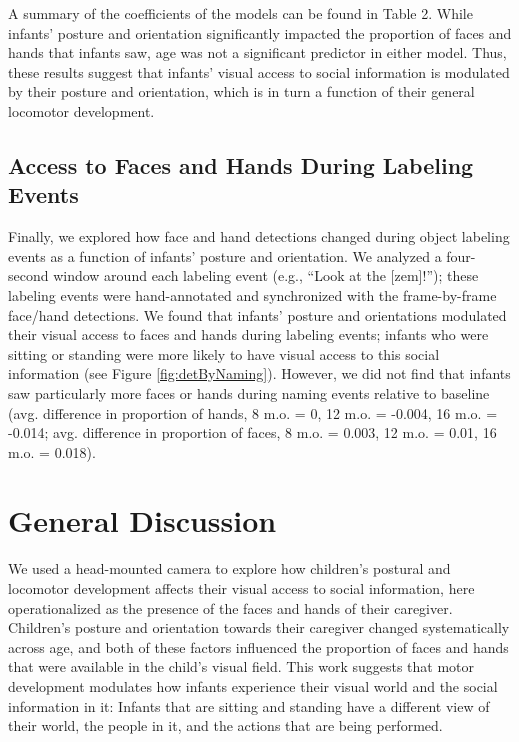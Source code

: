 \documentclass[10pt, letterpaper]{article}
\begin{document}
A summary of the coefficients of the models can be found in Table 2.
While infants' posture and orientation significantly impacted the
proportion of faces and hands that infants saw, age was not a
significant predictor in either model. Thus, these results suggest that
infants' visual access to social information is modulated by their
posture and orientation, which is in turn a function of their general
locomotor development.

\subsection{Access to Faces and Hands During Labeling
Events}\label{access-to-faces-and-hands-during-labeling-events}

Finally, we explored how face and hand detections changed during object
labeling events as a function of infants' posture and orientation. We
analyzed a four-second window around each labeling event (e.g., ``Look
at the {[}zem{]}!''); these labeling events were hand-annotated and
synchronized with the frame-by-frame face/hand detections. We found that
infants' posture and orientations modulated their visual access to faces
and hands during labeling events; infants who were sitting or standing
were more likely to have visual access to this social information (see
Figure \ref{fig:detByNaming}). However, we did not find that infants saw
particularly more faces or hands during naming events relative to
baseline (avg. difference in proportion of hands, 8 m.o. = 0, 12 m.o. =
-0.004, 16 m.o. = -0.014; avg. difference in proportion of faces, 8 m.o.
= 0.003, 12 m.o. = 0.01, 16 m.o. = 0.018).

\section{General Discussion}\label{general-discussion}

We used a head-mounted camera to explore how children's postural and
locomotor development affects their visual access to social information,
here operationalized as the presence of the faces and hands of their
caregiver. Children's posture and orientation towards their caregiver
changed systematically across age, and both of these factors influenced
the proportion of faces and hands that were available in the child's
visual field. This work suggests that motor development modulates how
infants experience their visual world and the social information in it:
Infants that are sitting and standing have a different view of their
world, the people in it, and the actions that are being performed.
\end{document}
